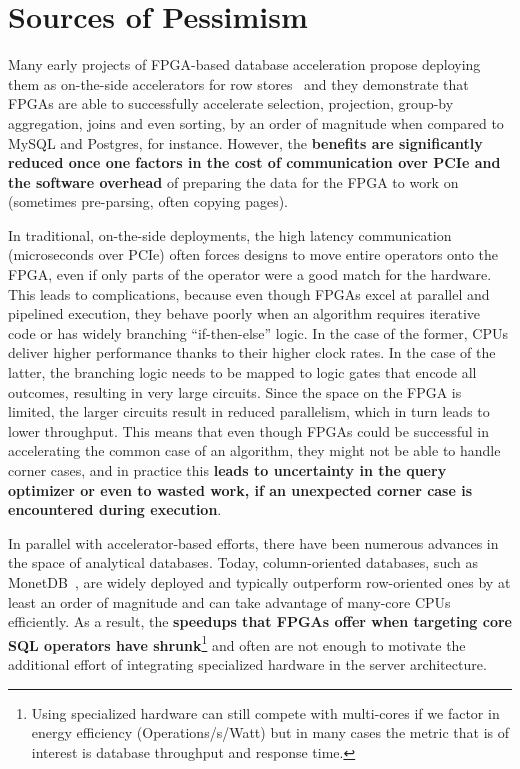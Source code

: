 \documentclass[11pt]{article}
\begin{document}
\section{Sources of Pessimism}

Many early projects of FPGA-based database acceleration propose deploying them as on-the-side accelerators for row stores~\cite{sukhwani-dbanalyitcs-ieee14}\cite{casper-fpgaacceldb-fccm14}\cite{dennl-sqlaccel-fccm13} and they demonstrate that FPGAs are able to successfully accelerate selection, projection, group-by aggregation, joins and even sorting, by an order of magnitude when compared to MySQL and Postgres, for instance. However, the \textbf{benefits are significantly reduced once one factors in the cost of communication over PCIe and the software overhead} of preparing the data for the FPGA to work on (sometimes pre-parsing, often copying pages). 

In traditional, on-the-side deployments, the high latency communication (microseconds over PCIe) often forces designs to move entire operators onto the FPGA, even if only parts of the operator were a good match for the hardware. This leads to complications, because even though FPGAs excel at parallel and pipelined execution, they behave poorly when an algorithm requires iterative code or has widely branching ``if-then-else'' logic. In the case of the former, CPUs deliver higher performance thanks to their higher clock rates. In the case of the latter, the branching logic needs to be mapped to logic gates that encode all outcomes, resulting in very large circuits. Since the space on the FPGA is limited, the larger circuits result in reduced parallelism, which in turn leads to lower throughput. This means that even though FPGAs could be successful in accelerating the common case of an algorithm, they might not be able to handle corner cases, and in practice this \textbf{leads to uncertainty in the query optimizer or even to wasted work, if an unexpected corner case is encountered during execution}. 

In parallel with accelerator-based efforts, there have been numerous advances in the space of analytical databases. Today, column-oriented databases, such as MonetDB~\cite{boncz-x100-cidr05}, are widely deployed and typically outperform row-oriented ones by at least an order of magnitude and can take advantage of many-core CPUs efficiently. As a result, the \textbf{speedups that FPGAs offer when targeting core SQL operators have shrunk}\footnote{Using specialized hardware can still compete with multi-cores if we factor in energy efficiency (Operations/s/Watt) but in many cases the metric that is of interest is database throughput and response time.} and often are not enough to motivate the additional effort of integrating specialized hardware in the server architecture.
\end{document}
